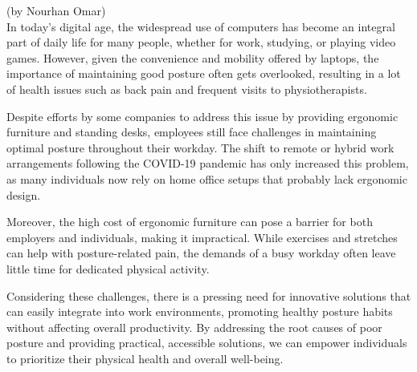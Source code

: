 (by Nourhan Omar)\\

In today's digital age, the widespread use of computers has become an integral part of daily life for many people, whether for work, studying, or playing video games. However, given the convenience and mobility offered by laptops, the importance of maintaining good posture often gets overlooked, resulting in a lot of health issues such as back pain and frequent visits to physiotherapists.

Despite efforts by some companies to address this issue by providing ergonomic furniture and standing desks, employees still face challenges in maintaining optimal posture throughout their workday. The shift to remote or hybrid work arrangements following the COVID-19 pandemic has only increased this problem, as many individuals now rely on home office setups that probably lack ergonomic design.

Moreover, the high cost of ergonomic furniture can pose a barrier for both employers and individuals, making it impractical. While exercises and stretches can help with posture-related pain, the demands of a busy workday often leave little time for dedicated physical activity.

Considering these challenges, there is a pressing need for innovative solutions that can easily integrate into work environments, promoting healthy posture habits without affecting overall productivity. By addressing the root causes of poor posture and providing practical, accessible solutions, we can empower individuals to prioritize their physical health and overall well-being.


